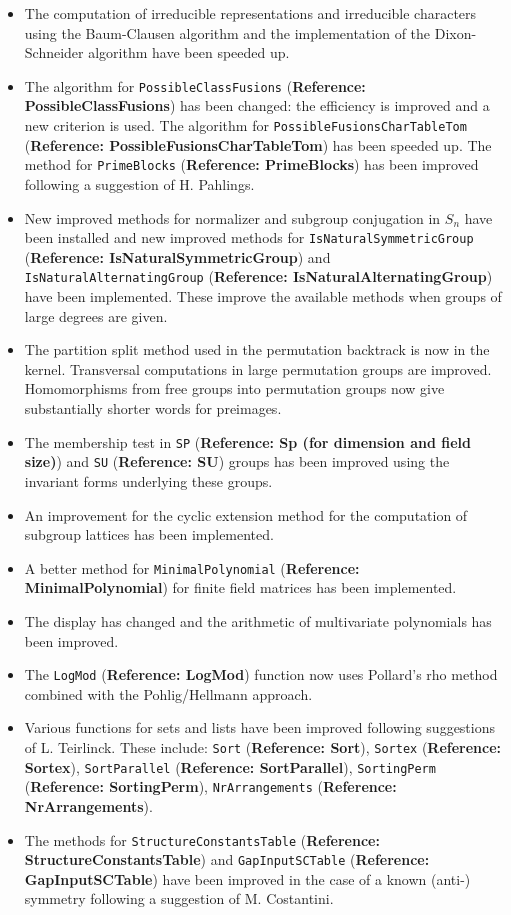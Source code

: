 \documentclass[a4paper,11pt]{report}
\begin{document}
{{{\begin{itemize}
\item  The computation of irreducible representations and irreducible characters
using the Baum-Clausen algorithm and the implementation of the Dixon-Schneider
algorithm have been speeded up. 
\item  The algorithm for \texttt{PossibleClassFusions} (\textbf{Reference: PossibleClassFusions}) has been changed: the efficiency is improved and a new criterion is used. The
algorithm for \texttt{PossibleFusionsCharTableTom} (\textbf{Reference: PossibleFusionsCharTableTom}) has been speeded up. The method for \texttt{PrimeBlocks} (\textbf{Reference: PrimeBlocks}) has been improved following a suggestion of H. Pahlings. 
\item  New improved methods for normalizer and subgroup conjugation in $S_n$ have been installed and new improved methods for \texttt{IsNaturalSymmetricGroup} (\textbf{Reference: IsNaturalSymmetricGroup}) and \texttt{IsNaturalAlternatingGroup} (\textbf{Reference: IsNaturalAlternatingGroup}) have been implemented. These improve the available methods when groups of
large degrees are given. 
\item  The partition split method used in the permutation backtrack is now in the
kernel. Transversal computations in large permutation groups are improved.
Homomorphisms from free groups into permutation groups now give substantially
shorter words for preimages. 
\item  The membership test in \texttt{SP} (\textbf{Reference: Sp (for dimension and field size)}) and \texttt{SU} (\textbf{Reference: SU}) groups has been improved using the invariant forms underlying these groups. 
\item  An improvement for the cyclic extension method for the computation of subgroup
lattices has been implemented. 
\item  A better method for \texttt{MinimalPolynomial} (\textbf{Reference: MinimalPolynomial}) for finite field matrices has been implemented. 
\item  The display has changed and the arithmetic of multivariate polynomials has
been improved. 
\item  The \texttt{LogMod} (\textbf{Reference: LogMod}) function now uses Pollard's rho method combined with the Pohlig/Hellmann
approach. 
\item  Various functions for sets and lists have been improved following suggestions
of L. Teirlinck. These include: \texttt{Sort} (\textbf{Reference: Sort}), \texttt{Sortex} (\textbf{Reference: Sortex}), \texttt{SortParallel} (\textbf{Reference: SortParallel}), \texttt{SortingPerm} (\textbf{Reference: SortingPerm}), \texttt{NrArrangements} (\textbf{Reference: NrArrangements}). 
\item  The methods for \texttt{StructureConstantsTable} (\textbf{Reference: StructureConstantsTable}) and \texttt{GapInputSCTable} (\textbf{Reference: GapInputSCTable}) have been improved in the case of a known (anti-) symmetry following a
suggestion of M. Costantini. 
\end{itemize}
 

}}}
\end{document}
